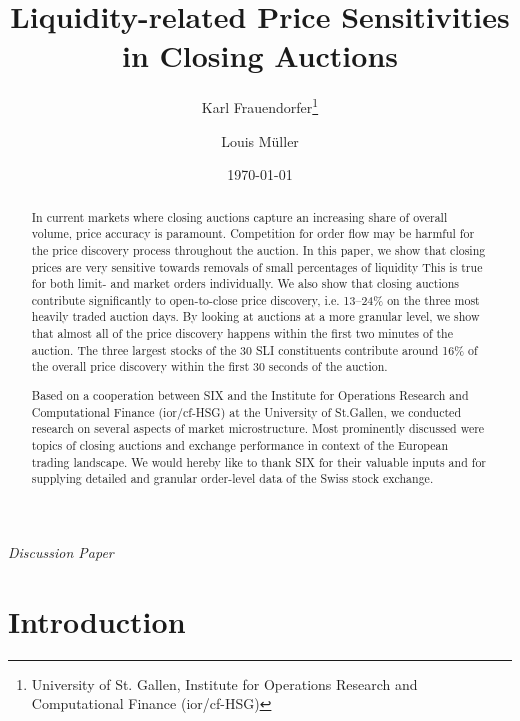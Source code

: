 \documentclass[11pt,a4paper, notitlepage]{article}
\title{Liquidity-related Price Sensitivities in Closing Auctions}
\author{Karl Frauendorfer\thanks{University of St. Gallen, Institute for Operations Research and Computational Finance (ior/cf-HSG)}
\and Louis Müller\footnotemark[1]}
\date{\today}
\begin{document}
	
	\begin{titlepage}
		
		\maketitle
		\centering
		\vspace{1cm}
		
		\emph{Discussion Paper}
		
		\vspace{1cm}
		
		\begin{abstract}
			In current markets where closing auctions capture an increasing share of overall volume, price accuracy is paramount. Competition for order flow may be harmful for the price discovery process throughout the auction. In this paper, we show that closing prices are very sensitive towards removals of small percentages of liquidity This is true for both limit- and market orders individually. We also show that closing auctions contribute significantly to open-to-close price discovery, i.e. 13--24\% on the three most heavily traded auction days. By looking at auctions at a more granular level, we show that almost all of the price discovery happens within the first two minutes of the auction. The three largest stocks of the 30 \acs{SLI} constituents contribute around 16\% of the overall price discovery within the first 30 seconds of the auction.
		\end{abstract}
		
		\vspace{0.5cm}
		
		\renewcommand{\abstractname}{Acknowledgement}
		\begin{abstract}
			Based on a cooperation between \acf{SIX} and the Institute for Operations Research and Computational Finance (ior/cf-HSG) at the University of St.Gallen, we conducted research on several aspects of market microstructure. Most prominently discussed were topics of closing auctions and exchange performance in context of the European trading landscape. We would hereby like to thank SIX for their valuable inputs and for supplying detailed and granular order-level data of the Swiss stock exchange.
		\end{abstract}
		
		\thispagestyle{empty}
	\end{titlepage}

%
	\clearpage
	
	
	\section{Introduction} \label{sec:introduction}
	
\end{document}
